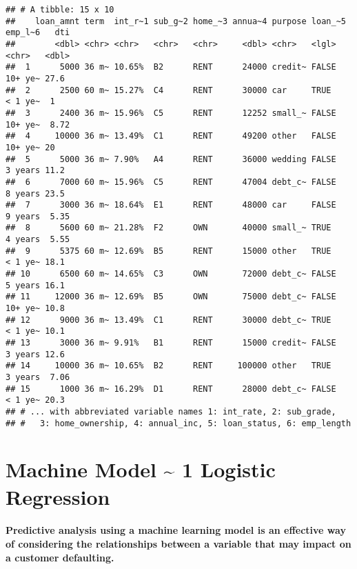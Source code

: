 \documentclass[
]{article}
\begin{document}
\begin{verbatim}
## # A tibble: 15 x 10
##    loan_amnt term  int_r~1 sub_g~2 home_~3 annua~4 purpose loan_~5 emp_l~6   dti
##        <dbl> <chr> <chr>   <chr>   <chr>     <dbl> <chr>   <lgl>   <chr>   <dbl>
##  1      5000 36 m~ 10.65%  B2      RENT      24000 credit~ FALSE   10+ ye~ 27.6 
##  2      2500 60 m~ 15.27%  C4      RENT      30000 car     TRUE    < 1 ye~  1   
##  3      2400 36 m~ 15.96%  C5      RENT      12252 small_~ FALSE   10+ ye~  8.72
##  4     10000 36 m~ 13.49%  C1      RENT      49200 other   FALSE   10+ ye~ 20   
##  5      5000 36 m~ 7.90%   A4      RENT      36000 wedding FALSE   3 years 11.2 
##  6      7000 60 m~ 15.96%  C5      RENT      47004 debt_c~ FALSE   8 years 23.5 
##  7      3000 36 m~ 18.64%  E1      RENT      48000 car     FALSE   9 years  5.35
##  8      5600 60 m~ 21.28%  F2      OWN       40000 small_~ TRUE    4 years  5.55
##  9      5375 60 m~ 12.69%  B5      RENT      15000 other   TRUE    < 1 ye~ 18.1 
## 10      6500 60 m~ 14.65%  C3      OWN       72000 debt_c~ FALSE   5 years 16.1 
## 11     12000 36 m~ 12.69%  B5      OWN       75000 debt_c~ FALSE   10+ ye~ 10.8 
## 12      9000 36 m~ 13.49%  C1      RENT      30000 debt_c~ TRUE    < 1 ye~ 10.1 
## 13      3000 36 m~ 9.91%   B1      RENT      15000 credit~ FALSE   3 years 12.6 
## 14     10000 36 m~ 10.65%  B2      RENT     100000 other   TRUE    3 years  7.06
## 15      1000 36 m~ 16.29%  D1      RENT      28000 debt_c~ FALSE   < 1 ye~ 20.3 
## # ... with abbreviated variable names 1: int_rate, 2: sub_grade,
## #   3: home_ownership, 4: annual_inc, 5: loan_status, 6: emp_length
\end{verbatim}

\hypertarget{machine-model-1-logistic-regression}{%
\section{Machine Model \textasciitilde{} 1 Logistic
Regression}\label{machine-model-1-logistic-regression}}

\hypertarget{predictive-analysis-using-a-machine-learning-model-is-an-effective-way-of-considering-the-relationships-between-a-variable-that-may-impact-on-a-customer-defaulting.}{%
\paragraph{Predictive analysis using a machine learning model is an
effective way of considering the relationships between a variable that
may impact on a customer
defaulting.}\label{predictive-analysis-using-a-machine-learning-model-is-an-effective-way-of-considering-the-relationships-between-a-variable-that-may-impact-on-a-customer-defaulting.}}
\end{document}
